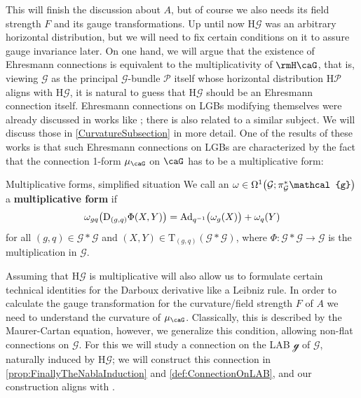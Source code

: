 \documentclass[reqno,a4paper,oneside]{amsart}
\newcommand\mutot{\mu_\caG}
\theoremstyle{plain}
\theoremstyle{remark}
\theoremstyle{definition}
\begin{document}
This will finish the discussion about $A$, but of course we also needs its field strength $F$ and its gauge transformations. Up until now $\mathrm{H}\mathcal{G}$ was an arbitrary horizontal distribution, but we will need to fix certain conditions on it to assure gauge invariance later. On one hand, we will argue that the existence of Ehresmann connections is equivalent to the multiplicativity of $\rmH \caG$, that is, viewing $\mathcal{G}$ as the principal $\mathcal{G}$-bundle $\mathcal{P}$ itself whose horizontal distribution $\mathrm{H}\mathcal{P}$ aligns with $\mathrm{H}\mathcal{G}$, it is natural to guess that $\mathrm{H}\mathcal{G}$ should be an Ehresmann connection itself. Ehresmann connections on LGBs modifying themselves were already discussed in works like \cite{LAURENTGENGOUXStienonXuMultiplicativeForms}; there is also \cite{FernandesMarcutMultiplicativeForms} related to a similar subject. We will discuss those in \ref{CurvatureSubsection} in more detail. One of the results of these works is that such Ehresmann connections on LGBs are characterized by the fact that the connection 1-form $\mutot$ on $\caG$ has to be a multiplicative form:

\begin{definitions*}{Multiplicative forms, simplified situation}
We call an $\omega \in \Omega^1\mleft( \mathcal{G}; \pi_{\mathcal{G}}^*\mathcal{g} \mright)$ a \textbf{multiplicative form} if
\begin{equation*}
\omega_{gq}\mleft( \mathrm{D}_{(g, q)}\Phi(X, Y)  \mright)
=
\mathrm{Ad}_{q^{-1}}\bigl( \omega_{g}(X) \bigr)
	+ \omega_{q}(Y)
\end{equation*}
for all $(g, q) \in \mathcal{G}*\mathcal{G}$ and $(X, Y) \in \mathrm{T}_{(g, q)}(\mathcal{G}*\mathcal{G})$, where $\Phi\colon \mathcal{G} * \mathcal{G} \to \mathcal{G}$ is the multiplication in $\mathcal{G}$.
\end{definitions*}

Assuming that $\mathrm{H}\mathcal{G}$ is multiplicative will also allow us to formulate certain technical identities for the Darboux derivative like a Leibniz rule. In order to calculate the gauge transformation for the curvature/field strength $F$ of $A$ we need to understand the curvature of $\mutot$. Classically, this is described by the Maurer-Cartan equation, however, we generalize this condition, allowing non-flat connections on $\mathcal{G}$. For this we will study a connection on the LAB $\mathcal{g}$ of $\mathcal{G}$, naturally induced by $\mathrm{H}\mathcal{G}$; we will construct this connection in \ref{prop:FinallyTheNablaInduction} and \ref{def:ConnectionOnLAB}, and our construction aligns with \cite[\S 4.5, Prop.\ 4.22]{LAURENTGENGOUXStienonXuMultiplicativeForms}.
\end{document}
